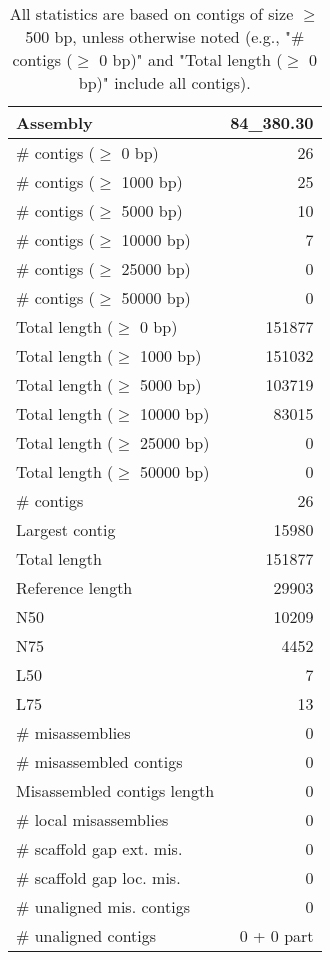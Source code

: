 \documentclass[12pt,a4paper]{article}
\begin{document}
\begin{table}[ht]
\begin{center}
\caption{All statistics are based on contigs of size $\geq$ 500 bp, unless otherwise noted (e.g., "\# contigs ($\geq$ 0 bp)" and "Total length ($\geq$ 0 bp)" include all contigs).}
\begin{tabular}{|l*{1}{|r}|}
\hline
Assembly & 84\_380.30 \\ \hline
\# contigs ($\geq$ 0 bp) & 26 \\ \hline
\# contigs ($\geq$ 1000 bp) & 25 \\ \hline
\# contigs ($\geq$ 5000 bp) & 10 \\ \hline
\# contigs ($\geq$ 10000 bp) & 7 \\ \hline
\# contigs ($\geq$ 25000 bp) & 0 \\ \hline
\# contigs ($\geq$ 50000 bp) & 0 \\ \hline
Total length ($\geq$ 0 bp) & 151877 \\ \hline
Total length ($\geq$ 1000 bp) & 151032 \\ \hline
Total length ($\geq$ 5000 bp) & 103719 \\ \hline
Total length ($\geq$ 10000 bp) & 83015 \\ \hline
Total length ($\geq$ 25000 bp) & 0 \\ \hline
Total length ($\geq$ 50000 bp) & 0 \\ \hline
\# contigs & 26 \\ \hline
Largest contig & 15980 \\ \hline
Total length & 151877 \\ \hline
Reference length & 29903 \\ \hline
N50 & 10209 \\ \hline
N75 & 4452 \\ \hline
L50 & 7 \\ \hline
L75 & 13 \\ \hline
\# misassemblies & 0 \\ \hline
\# misassembled contigs & 0 \\ \hline
Misassembled contigs length & 0 \\ \hline
\# local misassemblies & 0 \\ \hline
\# scaffold gap ext. mis. & 0 \\ \hline
\# scaffold gap loc. mis. & 0 \\ \hline
\# unaligned mis. contigs & 0 \\ \hline
\# unaligned contigs & 0 + 0 part \\ \hline

\end{tabular}
\end{center}
\end{table}
\end{document}
